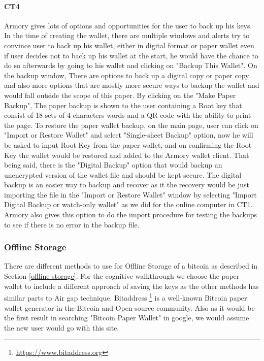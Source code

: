 \paragraph{CT4} 
Armory gives lots of options and opportunities for the user to back up his keys. In the time of creating the wallet, there are multiple windows and alerts try to convince user to back up his wallet, either in digital format or paper wallet even if user decides not to back up his wallet at the start, he would have the chance to do so afterwards by going to his wallet and clicking on "Backup This Wallet". On the backup window, There are options to back up a digital copy or paper copy and also more options that are mostly more secure ways to backup the wallet and would fall outside the scope of this paper. By clicking on the "Make Paper Backup", The paper backup is shown to the user containing a Root key that consist of 18 sets of 4-characters words and a QR code with the ability to print the page. To restore the paper wallet backup, on the main page, user can click on "Import or Restore Wallet" and select "Single-sheet Backup" option, now he will be asked to input Root Key from the paper wallet, and on confirming the Root Key the wallet would be restored and added to the Armory wallet client. That being said, there is the "Digital Backup" option that would backup an unencrypted version of the wallet file and should be kept secure. The digital backup is an easier way to backup and recover as it the recovery would be just importing the file in the "Import or Restore Wallet" window by selecting "Import Digital Backup or watch-only wallet" as we did for the online computer in CT1. Armory also gives this option to do the import procedure for testing the backups to see if there is no error in the backup file.



\subsubsection{Offline Storage}
There are different methods to use for Offline Storage of a bitcoin as described in Section \ref{offline storage}. For the cognitive walkthrough we choose the paper wallet to include a different approach of saving the keys as the other methods has similar parts to Air gap technique. Bitaddress \footnote{\url{https://www.bitaddress.org}} is a well-known Bitcoin paper wallet generator in the Bitcoin and Open-source community. Also as it would be the first result in searching "Bitcoin Paper Wallet" in google, we would assume the new user would go with this site.\\

